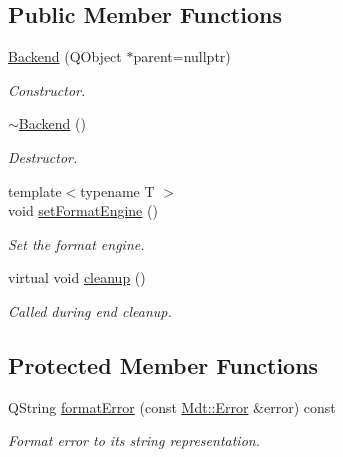 \subsection*{Public Member Functions}
\begin{DoxyCompactItemize}
\item 
\hyperlink{class_mdt_1_1_error_logger_1_1_backend_ad0e3d73ad0c0248f2d62e00f5180ca1e}{Backend} (Q\+Object $\ast$parent=nullptr)\hypertarget{class_mdt_1_1_error_logger_1_1_backend_ad0e3d73ad0c0248f2d62e00f5180ca1e}{}\label{class_mdt_1_1_error_logger_1_1_backend_ad0e3d73ad0c0248f2d62e00f5180ca1e}

\begin{DoxyCompactList}\small\item\em Constructor. \end{DoxyCompactList}\item 
\hyperlink{class_mdt_1_1_error_logger_1_1_backend_ae7a4ba51888ecb73202f48666e0fe11e}{$\sim$\+Backend} ()\hypertarget{class_mdt_1_1_error_logger_1_1_backend_ae7a4ba51888ecb73202f48666e0fe11e}{}\label{class_mdt_1_1_error_logger_1_1_backend_ae7a4ba51888ecb73202f48666e0fe11e}

\begin{DoxyCompactList}\small\item\em Destructor. \end{DoxyCompactList}\item 
{\footnotesize template$<$typename T $>$ }\\void \hyperlink{class_mdt_1_1_error_logger_1_1_backend_a5e29be8b58d1658b71aef7b69f5aff81}{set\+Format\+Engine} ()
\begin{DoxyCompactList}\small\item\em Set the format engine. \end{DoxyCompactList}\item 
virtual void \hyperlink{class_mdt_1_1_error_logger_1_1_backend_a3bedd2eae53d0f4ed9234ef086bd2cac}{cleanup} ()
\begin{DoxyCompactList}\small\item\em Called during end cleanup. \end{DoxyCompactList}\end{DoxyCompactItemize}
\subsection*{Protected Member Functions}
\begin{DoxyCompactItemize}
\item 
Q\+String \hyperlink{class_mdt_1_1_error_logger_1_1_backend_adf97b152bfaa2f5015fd6ef769db7b58}{format\+Error} (const \hyperlink{class_mdt_1_1_error}{Mdt\+::\+Error} \&error) const 
\begin{DoxyCompactList}\small\item\em Format {\itshape error} to its string representation. \end{DoxyCompactList}\end{DoxyCompactItemize}


